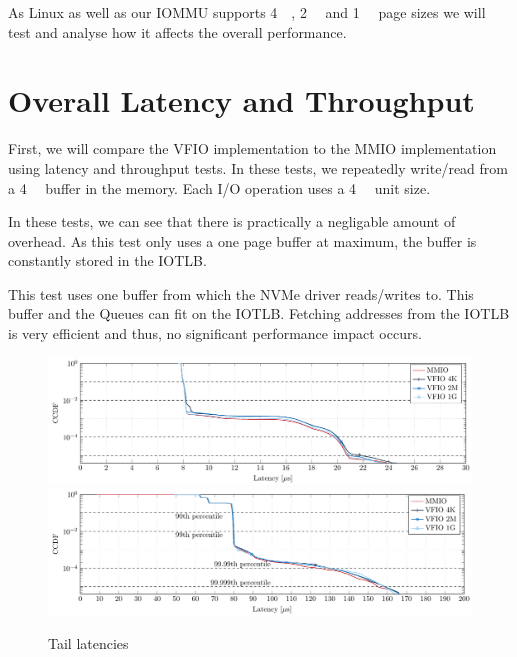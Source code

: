 
As Linux as well as our IOMMU supports \qty{4}{\kibi\byte}, \qty{2}{\mebi\byte} and \qty{1}{\gibi\byte} page sizes we will test and analyse how it affects the overall performance.

\section{Overall Latency and Throughput}
First, we will compare the VFIO implementation to the MMIO implementation using latency and throughput tests. In these tests, we repeatedly write/read from a \qty{4}{\kibi\byte} buffer in the memory. Each I/O operation uses a \qty{4}{\kibi\byte} unit size.

In these tests, we can see that there is practically a negligable amount of overhead. As this test only uses a one page buffer at maximum, the buffer is constantly stored in the IOTLB.

This test uses one buffer from which the NVMe driver reads/writes to. This buffer and the Queues can fit on the IOTLB. Fetching addresses from the IOTLB is very efficient and thus, no significant performance impact occurs.

\begin{figure}
    \centering
     {\includegraphics[width=\textwidth]{figures/latency_ccdf_write} \label{fig:ccdf-write}}
     {\includegraphics[width=\textwidth]{figures/latency_ccdf_read} \label{fig:ccdf-read}}
    \caption{Tail latencies}
    \label{fig:ccdf}
\end{figure}

